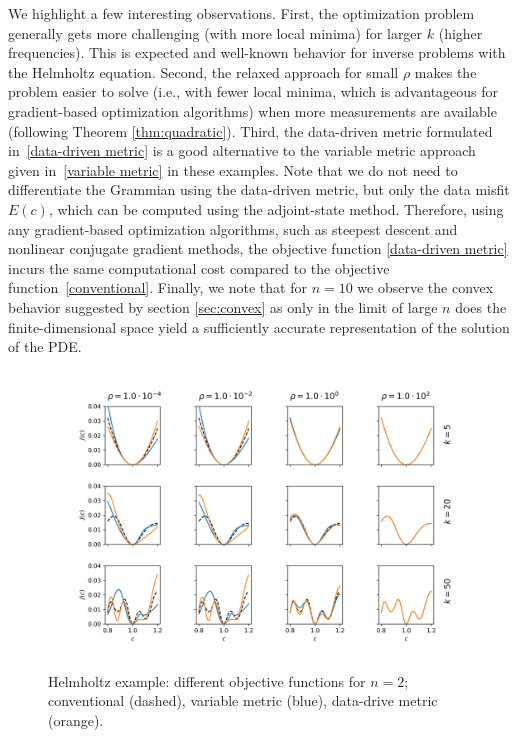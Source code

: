 \documentclass[12pt]{amsart}
\begin{document}
We highlight a few interesting observations. First, the optimization problem generally gets more challenging (with more local minima) for larger $k$ (higher frequencies). This is expected and well-known behavior for inverse problems with the Helmholtz equation. Second, the relaxed approach for small $\rho$ makes the problem easier to solve (i.e., with fewer local minima, which is advantageous for gradient-based optimization algorithms) when more measurements are available (following Theorem \ref{thm:quadratic}). Third, the data-driven metric formulated in~\eqref{data-driven metric} is a good alternative to the variable metric approach given in~\eqref{variable metric} in these examples. Note that we do not need to differentiate the Grammian using the data-driven metric, but only the data misfit $E(c)$, which can be computed using the adjoint-state method. Therefore, using any gradient-based optimization algorithms, such as steepest descent and nonlinear conjugate gradient methods, the objective function \eqref{data-driven metric} incurs the same computational cost compared to the objective function~\eqref{conventional}. %
Finally, we note that for $n=10$ we observe the convex behavior suggested by section \ref{sec:convex} as only in the limit of large $n$ does the finite-dimensional space yield a sufficiently accurate representation of the solution of the PDE.
\begin{figure}
\includegraphics[scale=.5]{Figures/Helmholtz1D_2.png}
\caption{Helmholtz example: different objective functions for $n=2$; conventional (dashed), variable metric (blue), data-drive metric (orange).}\label{fig:helmholtz1da}
\end{figure}
\end{document}
